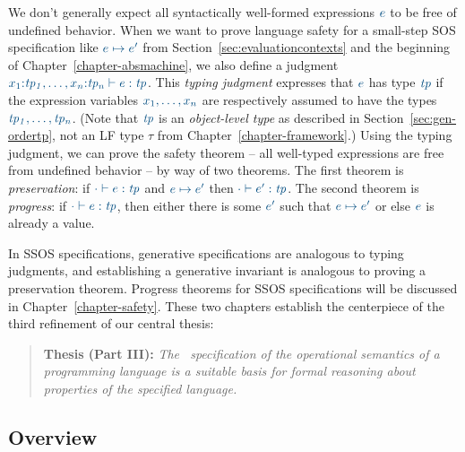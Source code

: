 We don't generally expect all syntactically well-formed expressions
$\obj{e}$ to be free of undefined behavior. When we want to prove
language safety for a small-step SOS specification like $\obj{e
  \mapsto e'}$ from Section~\ref{sec:evaluationcontexts} and the
beginning of Chapter~\ref{chapter-absmachine}, we also define a
judgment $\obj{x_1{:}{\it tp_1},\ldots, x_n{:}{\it tp_n} \vdash e :
  {\it tp}}$.  This {\it typing judgment} expresses that $\obj{e}$ has
type $\obj{\it tp}$ if the expression variables $\obj{x_1, \ldots,
  x_n}$ are respectively assumed to have the types $\obj{\it tp_1,
  \ldots, tp_n}$. (Note that $\obj{\it tp}$ is an {\it object-level
  type} as described in Section~\ref{sec:gen-ordertp}, not an LF type
$\tau$ from Chapter~\ref{chapter-framework}.) Using the typing
judgment, we can prove the safety theorem -- all well-typed
expressions are free from undefined behavior -- by way of two
theorems. The first theorem is {\it preservation}: if $\obj{\cdot
  \vdash e : {\it tp}}$ and $\obj{e \mapsto e'}$ then $\obj{\cdot
  \vdash e' : {\it tp}}$. The second theorem is {\it progress}: if
$\obj{\cdot \vdash e : {\it tp}}$, then either there is some
$\obj{e'}$ such that $\obj{e \mapsto e'}$ or else $\obj{e}$ is already
a value.

In SSOS specifications, generative specifications are analogous to
typing judgments, and establishing a generative invariant is analogous
to proving a preservation theorem. Progress theorems for SSOS
specifications will be discussed in Chapter~\ref{chapter-safety}.
These two chapters establish the centerpiece of the third refinement of
our central thesis:

\smallskip
\begin{quote} 
  {\bf Thesis (Part III):} {\it The \sls~specification of the operational
    semantics of a programming language is a suitable basis for formal
    reasoning about properties of the specified language.}
\end{quote} 


\subsection*{Overview}


